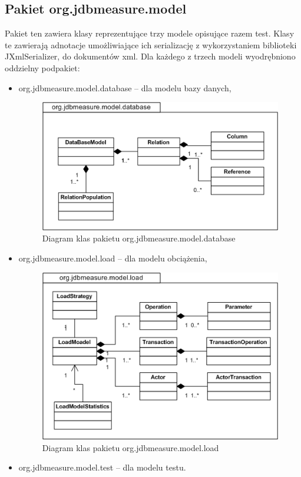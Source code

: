\subsection{Pakiet org.jdbmeasure.model}
Pakiet ten zawiera klasy reprezentujące trzy modele opisujące razem test.
Klasy te zawierają adnotacje umożliwiające ich serializację z wykorzystaniem biblioteki JXmlSerializer,
do dokumentów xml. Dla każdego z trzech modeli wyodrębniono oddzielny podpakiet:
\begin{itemize}
\item org.jdbmeasure.model.database -- dla modelu bazy danych,
\begin{figure}[h]
\begin{center}
\includegraphics[width=0.8\linewidth]{figures/uml02.png}
\end{center}
\caption{Diagram klas pakietu org.jdbmeasure.model.database}\label{rys:uml02}
\end{figure}
\item org.jdbmeasure.model.load -- dla modelu obciążenia,
\begin{figure}[h]
\begin{center}
\includegraphics[width=0.8\linewidth]{figures/uml03.png}
\end{center}
\caption{Diagram klas pakietu org.jdbmeasure.model.load}\label{rys:uml03}
\end{figure}
\item org.jdbmeasure.model.test -- dla modelu testu.


\end{itemize}
